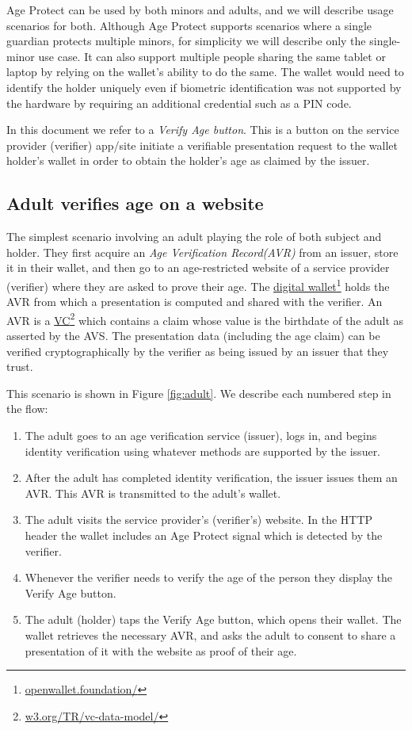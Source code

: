 \documentclass[11pt, oneside]{article}   	%
\newcommand{\hyperfootnote}[1][]{\def\ArgI{{#1}}\hyperfootnoteRelay}
\newcommand\hyperfootnoteRelay[2][]{\href{#1#2}{\ArgI}\footnote{\href{#1#2}{#2}}}
\begin{document}
Age Protect can be used by both minors and adults, and we will describe usage scenarios for both. Although Age Protect supports scenarios where a single guardian protects multiple minors, for simplicity we will describe only the single-minor use case. It can also support multiple people sharing the same tablet or laptop by relying on the wallet's ability to do the same. The wallet would need to identify the holder uniquely even if biometric identification was not supported by the hardware by requiring an additional credential such as a PIN code.

In this document we refer to a \emph{Verify Age button}. This is a button on the service provider (verifier) app/site initiate a verifiable presentation request to the wallet holder's wallet in order to obtain the holder's age as claimed by the issuer.

\subsection{Adult verifies age on a website}

The simplest scenario involving an adult playing the role of both subject and holder. They first acquire an \emph{Age Verification Record(AVR)} from an issuer, store it in their wallet, and then go to an age-restricted website of a service provider (verifier) where they are asked to prove their age. The \hyperfootnote[digital wallet][https://]{openwallet.foundation/} holds the AVR from which a presentation is computed and shared with the verifier. An AVR is a \hyperfootnote[VC][https://]{w3.org/TR/vc-data-model/} which contains a claim whose value is the birthdate of the adult as asserted by the AVS. The presentation data (including the age claim) can be verified cryptographically by the verifier as being issued by an issuer that they trust.

This scenario is shown in Figure \ref{fig:adult}. We describe each numbered step in the flow: 

\begin{enumerate}
	\item The adult goes to an age verification service (issuer), logs in, and begins identity verification using whatever methods are supported by the issuer. 
	\item After the adult has completed identity verification, the issuer issues them an AVR. This AVR is transmitted to the adult's wallet.
	\item The adult visits the service provider's (verifier's) website. In the HTTP header the wallet includes an Age Protect signal which is detected by the verifier. 
	\item Whenever the verifier needs to verify the age of the person they display the Verify Age button.
	\item The adult (holder) taps the Verify Age button, which opens their wallet. The wallet retrieves the necessary AVR, and asks the adult to consent to share a presentation of it with the website as proof of their age. 
\end{enumerate}
\end{document}
